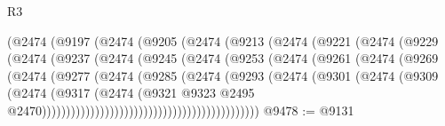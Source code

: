 \begin{lexlean}{R3}
\begin{coremodule}
                          (@2474
                            (@9197
                              (@2474
                                (@9205
                                  (@2474
                                    (@9213
                                      (@2474
                                        (@9221
                                          (@2474
                                            (@9229
                                              (@2474
                                                (@9237
                                                  (@2474
                                                    (@9245
                                                      (@2474
                                                        (@9253
                                                          (@2474
                                                            (@9261
                                                              (@2474
                                                                (@9269
                                                                  (@2474
                                                                    (@9277
                                                                      (@2474
                                                                        (@9285
                                                                          (@2474
                                                                            (@9293
                                                                              (@2474
                                                                                (@9301
                                                                                  (@2474
                                                                                    (@9309
                                                                                      (@2474
                                                                                        (@9317
                                                                                          (@2474
                                                                                            (@9321
                                                                                              @9323
                                                                                              @2495
                                                                                              @2470)))))))))))))))))))))))))))))))))))))))))))))
@9478 := @9131

\end{coremodule}
\end{lexlean}
